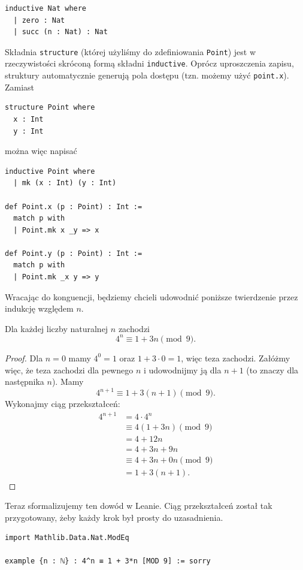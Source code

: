 \documentclass[polish,pretty,bibliography=totocnumbered]{angav}
\newcommand{\Lean}[1]{\texttt{#1}}
\begin{document}
\begin{verbatim}
inductive Nat where
  | zero : Nat
  | succ (n : Nat) : Nat
\end{verbatim}

\begin{remark*}
    Składnia \Lean{structure} (której użyliśmy do zdefiniowania \Lean{Point}) jest w rzeczywistości skróconą formą składni \Lean{inductive}. Oprócz uproszczenia zapisu, struktury automatycznie generują pola dostępu (tzn. możemy użyć \Lean{point.x}). Zamiast
    \begin{verbatim}
structure Point where
  x : Int
  y : Int
    \end{verbatim}
    można więc napisać
    \begin{verbatim}
inductive Point where
  | mk (x : Int) (y : Int)

def Point.x (p : Point) : Int :=
  match p with
  | Point.mk x _y => x

def Point.y (p : Point) : Int :=
  match p with
  | Point.mk _x y => y
    \end{verbatim}
\end{remark*}

Wracając do konguencji, będziemy chcieli udowodnić poniższe twierdzenie przez indukcję względem $n$.
\begin{theorem}
    Dla każdej liczby naturalnej $n$ zachodzi
    \[ 4^n \equiv 1 + 3n \pmod{9}. \]
\end{theorem}
\begin{proof}
    Dla $n = 0$ mamy $4^0 = 1$ oraz $1 + 3 \cdot 0 = 1$, więc teza zachodzi. Załóżmy więc, że teza zachodzi dla pewnego $n$ i udowodnijmy ją dla $n + 1$ (to znaczy dla następnika $n$). Mamy
    \[ 4^{n+1} \equiv 1 + 3(n + 1) \pmod{9}. \]
    Wykonajmy ciąg przekształceń:
    \begin{align*}
        4^{n+1} &= 4 \cdot 4^n \\
        &\equiv 4(1 + 3n) \pmod{9} \\
        &= 4 + 12n \\
        &= 4 + 3n + 9n \\
        &\equiv 4 + 3n + 0n \pmod{9} \\
        &= 1 + 3(n + 1).
    \end{align*}
\end{proof}

Teraz sformalizujemy ten dowód w Leanie. Ciąg przekształceń został tak przygotowany, żeby każdy krok był prosty do uzasadnienia.
\begin{verbatim}
import Mathlib.Data.Nat.ModEq

example {n : ℕ} : 4^n ≡ 1 + 3*n [MOD 9] := sorry
\end{verbatim}
\end{document}
